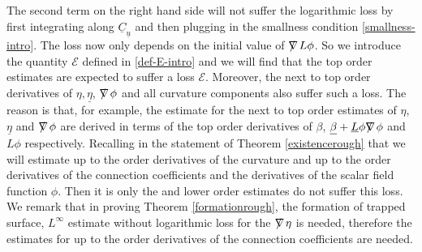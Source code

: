 \documentclass[11pt,reqno]{amsart}
\theoremstyle{definition}
\numberwithin{equation}{section}
\def\betab{\underline{\beta}}
\def\etab{\underline{\eta}}
\def\Lb{\underline{L}}
\def\ub{\underline{u}}
\def\Cb{\underline{C}}
\def\nablas{\mbox{$\nabla \mkern -13mu /$ }}
\begin{document}
The second term on the right hand side will not suffer the logarithmic loss by first integrating along $\Cb_{\ub}$ and then plugging in the smallness condition \eqref{smallness-intro}. The loss now only depends on the initial value of $\nablas L\phi$. So we introduce the quantity $\mathscr{E}$ defined in \eqref{def-E-intro} and we will find that the top order estimates are expected to suffer a loss $\mathscr{E}$. Moreover, the next to top order derivatives of $\eta,\etab$, $\nablas\phi$ and all curvature components also suffer such a loss. The reason is that, for example, the estimate for the next to top order estimates of $\eta$, $\etab$ and $\nablas\phi$ are derived in terms of the top order derivatives of $\beta$, $\betab+\Lb\phi\nablas\phi$ and $L\phi$ respectively. Recalling in the statement of Theorem \ref{existencerough} that we will estimate up to the  order derivatives of the curvature and up to the  order derivatives of the connection coefficients and the derivatives of the scalar field function $\phi$. Then it is only the  and lower order estimates do not suffer this loss. We remark that in proving Theorem \ref{formationrough}, the formation of trapped surface, $L^\infty$ estimate without logarithmic loss for the $\nablas\eta$ is needed, therefore the estimates for up to the  order derivatives of the connection coefficients are needed.
\end{document}
